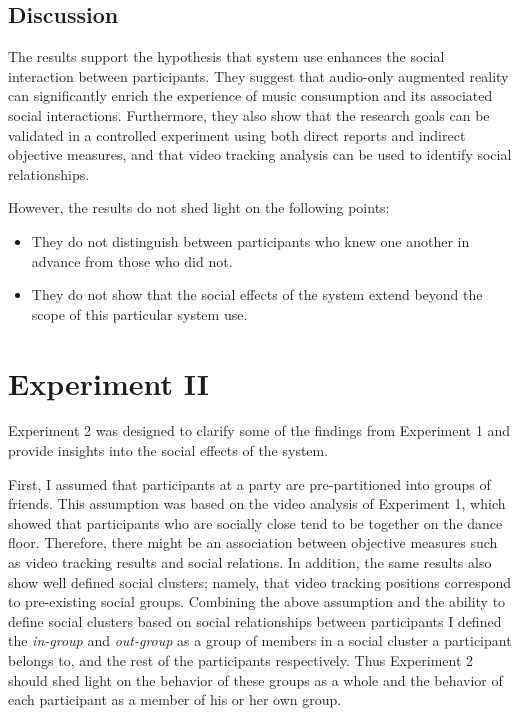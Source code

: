 \documentclass[a4paper,11pt]{article}
\newcommand{\definition}[1]{\emph{#1}}
\begin{document}
{\subsection{Discussion}

The results support the hypothesis that system use enhances the social interaction between participants.
They suggest that audio-only augmented reality can significantly enrich the experience of music consumption and its associated social interactions.
Furthermore, they also show that the research goals can be validated in a controlled experiment using both direct reports and indirect objective measures, and that video tracking analysis can be used to identify social relationships.

However, the results do not shed light on the following points:

\begin{itemize}
	\item They do not distinguish between participants who knew one another in advance from those who did not.
	\item They do not show that the social effects of the system extend beyond the scope of this particular system use.
\end{itemize}

\clearpage\section{Experiment II}

Experiment 2 was designed to clarify some of the findings from Experiment 1 and provide insights into the social effects of the system.

First, I assumed that participants at a party are pre-partitioned into groups of friends.
This assumption was based on the video analysis of Experiment 1, which showed that participants who are socially close tend to be together on the dance floor.
Therefore, there might be an association between objective measures such as video tracking results and social relations.
In addition, the same results also show well defined social clusters;
namely, that video tracking positions correspond to pre-existing social groups.
Combining the above assumption and the ability to define social clusters based on social relationships between participants I defined the \definition{in-group} and \definition{out-group} as a group of members in a social cluster a participant belongs to, and the rest of the participants respectively.
Thus Experiment 2 should shed light on the behavior of these groups as a whole and the behavior of each participant as a member of his or her own group.

}
\end{document}
